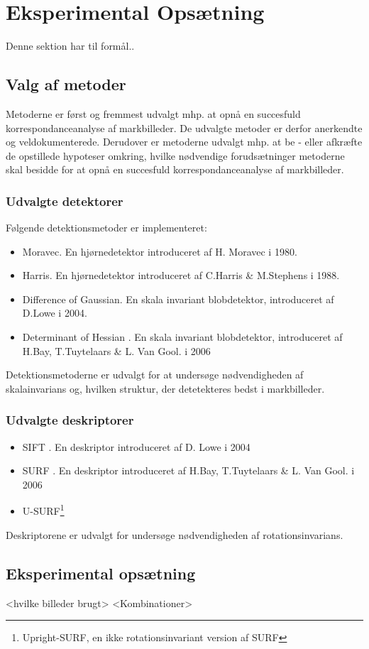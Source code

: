 \chapter{Eksperimental Opsætning}
Denne sektion har til formål..
\section{Valg af metoder}
Metoderne er først og fremmest udvalgt mhp. at opnå en succesfuld korrespondanceanalyse af markbilleder. De udvalgte metoder er derfor anerkendte og veldokumenterede. Derudover er metoderne udvalgt mhp. at be - eller afkræfte de opstillede hypoteser omkring, hvilke nødvendige forudsætninger metoderne skal besidde for at opnå en succesfuld korrespondanceanalyse af markbilleder.
\subsection{Udvalgte detektorer}
Følgende detektionsmetoder er implementeret:
\begin{itemize}
\item{Moravec\cite{moravec}. En hjørnedetektor introduceret af H. Moravec i 1980.}
\item{Harris\cite{harris}. En hjørnedetektor introduceret af C.Harris \& M.Stephens i 1988.}
\item{Difference of Gaussian\cite{SIFT}. En skala invariant blobdetektor, introduceret af D.Lowe i 2004.}
\item{Determinant of Hessian \cite{SURF}. En skala invariant blobdetektor, introduceret af H.Bay, T.Tuytelaars \& L. Van Gool. i 2006}
\end{itemize}
Detektionsmetoderne er udvalgt for at undersøge nødvendigheden af skalainvarians og, hvilken struktur, der detetekteres bedst i markbilleder.
\subsection{Udvalgte deskriptorer}
\begin{itemize}
\item{SIFT \cite{SIFT}. En deskriptor introduceret af D. Lowe i 2004}
\item{SURF \cite{SURF}. En deskriptor introduceret af  H.Bay, T.Tuytelaars \& L. Van Gool. i 2006}
\item{U-SURF\footnote{Upright-SURF, en ikke rotationsinvariant version af SURF}} 
\end{itemize}
Deskriptorene er udvalgt for undersøge nødvendigheden af rotationsinvarians.
\section{Eksperimental opsætning}
<hvilke billeder brugt>
<Kombinationer>